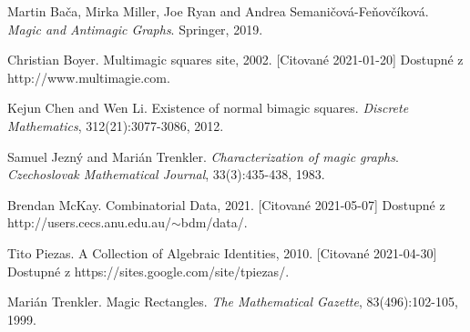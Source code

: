 \documentclass[12pt, oneside]{book}  %
\begin{document}
\newpage 

\tableofcontents



\newpage 



\mainmatter


 













\newpage	

\backmatter

\thispagestyle{empty}
\clearpage


% 

\begin{thebibliography}{7}
 Martin Bača, Mirka Miller, Joe Ryan and Andrea Semaničová-Feňovčíková. \textit{Magic and Antimagic Graphs}. Springer, 2019.

 Christian Boyer. Multimagic squares site, 2002. [Citované 2021-01-20] Dostupné z http://www.multimagie.com.

 Kejun Chen and Wen Li. Existence of normal bimagic squares. \textit{Discrete Mathematics}, 312(21):3077-3086, 2012.

 Samuel Jezný and Marián Trenkler. \textit{Characterization of magic graphs}. \textit{Czechoslovak Mathematical Journal}, 33(3):435-438, 1983.

 Brendan McKay. Combinatorial Data, 2021. [Citované 2021-05-07] Dostupné z http://users.cecs.anu.edu.au/$\sim$bdm/data/.

 Tito Piezas. A Collection of Algebraic Identities, 2010. [Citované 2021-04-30] Dostupné z https://sites.google.com/site/tpiezas/.

 Marián Trenkler. Magic Rectangles. \textit{The Mathematical Gazette}, 83(496):102-105, 1999.
\end{thebibliography}



%


%
\end{document}

